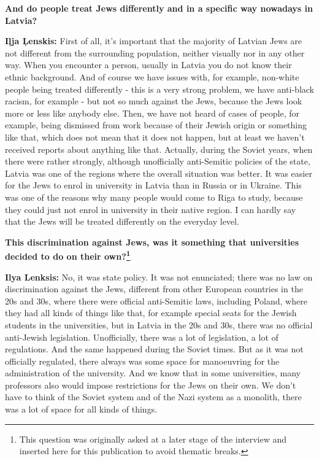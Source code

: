 \textbf{And do people treat Jews differently and in a specific way nowadays in Latvia?} 

\textbf{Iļja Ļenskis:} First of all, it's important that the majority of Latvian Jews are not different from the surrounding population, neither visually nor in any other way. When you encounter a person, usually in Latvia you do not know their ethnic background. And of course we have issues with, for example, non-white people being treated differently - this is a very strong problem, we have anti-black racism, for example - but not so much against the Jews, because the Jews look more or less like anybody else. Then, we have not heard of cases of people, for example, being dismissed from work because of their Jewish origin or something like that, which does not mean that it does not happen, but at least we haven't received reports about anything like that. Actually, during the Soviet years, when there were rather strongly, although unofficially anti-Semitic policies of the state, Latvia was one of the regions where the overall situation was better. It was easier for the Jews to enrol in university in Latvia than in Russia or in Ukraine. This was one of the reasons why many people would come to Riga to study, because they could just not enrol in university in their native region. I can hardly say that the Jews will be treated differently on the everyday level. 

\textbf{This discrimination against Jews, was it something that universities decided to do on their own?\footnote{This question was originally asked at a later stage of the interview and inserted here for this publication to avoid thematic breaks.}} 

\textbf{Ilya Lenksis:} No, it was state policy. 
It was not enunciated; there was no law on discrimination against the Jews, different from other European countries in the 20s and 30s, where there were official anti-Semitic laws, including Poland, where they had all kinds of things like that, for example special seats for the Jewish students in the universities, but in Latvia in the 20s and 30s, there was no official anti-Jewish legislation. Unofficially, there was a lot of legislation, a lot of regulations. And the same happened during the Soviet times. But as it was not officially regulated, there always was some space for manoeuvring for the administration of the university. And we know that in some universities, many professors also would impose restrictions for the Jews on their own. We don’t have to think of the Soviet system and of the Nazi system as a monolith, there was a lot of space for all kinds of things. 

